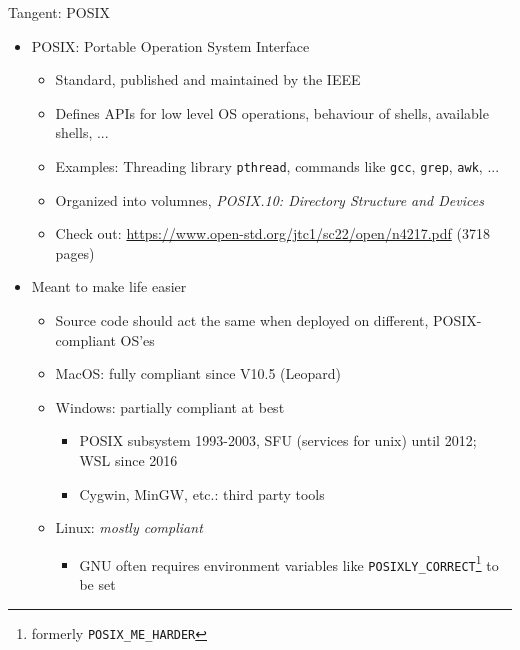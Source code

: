 \begin{frame}[fragile]{Tangent: POSIX}
%
\begin{itemize}
\item POSIX: Portable Operation System Interface
	\begin{itemize}
	\item Standard, published and maintained by the IEEE
	\item Defines APIs for low level OS operations, behaviour of shells, available shells, ...
	\item Examples: Threading library \texttt{pthread}, commands like \texttt{gcc}, \texttt{grep}, \texttt{awk}, ...
	\item Organized into volumnes, \zB \emph{POSIX.10: Directory Structure and Devices}
	\item Check out: \url{https://www.open-std.org/jtc1/sc22/open/n4217.pdf} (3718 pages)
	\end{itemize}
\item[\Thus] Meant to make life easier
	\begin{itemize}
	\item Source code should act the same when deployed on different, POSIX-compliant OS'es
	\item MacOS: fully compliant since V10.5 (Leopard)
	\item Windows: partially compliant at best
		\begin{itemize}
		\item POSIX subsystem 1993-2003, SFU (services for unix) until 2012; WSL since 2016
		\item Cygwin, MinGW, etc.: third party tools
		\end{itemize}
	\item Linux: \emph{mostly compliant}
		\begin{itemize}
		\item GNU often requires environment variables like \texttt{POSIXLY\_CORRECT}\footnote{%
			formerly \texttt{POSIX\_ME\_HARDER}
		} to be set
		\end{itemize}
	\end{itemize}
\end{itemize}
%
\end{frame}


